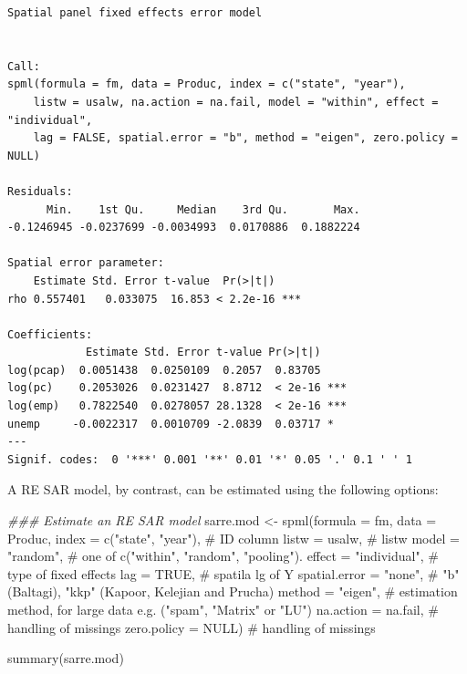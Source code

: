 \documentclass[
  letterpaper,
  DIV=11,
  numbers=noendperiod]{scrreprt}
\newenvironment{Shaded}{\begin{snugshade}}{\end{snugshade}}
\newcommand{\AttributeTok}[1]{\textcolor[rgb]{0.40,0.45,0.13}{#1}}
\newcommand{\CommentTok}[1]{\textcolor[rgb]{0.37,0.37,0.37}{#1}}
\newcommand{\ConstantTok}[1]{\textcolor[rgb]{0.56,0.35,0.01}{#1}}
\newcommand{\DocumentationTok}[1]{\textcolor[rgb]{0.37,0.37,0.37}{\textit{#1}}}
\newcommand{\FunctionTok}[1]{\textcolor[rgb]{0.28,0.35,0.67}{#1}}
\newcommand{\NormalTok}[1]{\textcolor[rgb]{0.00,0.23,0.31}{#1}}
\newcommand{\OtherTok}[1]{\textcolor[rgb]{0.00,0.23,0.31}{#1}}
\newcommand{\StringTok}[1]{\textcolor[rgb]{0.13,0.47,0.30}{#1}}
\begin{document}
\begin{verbatim}
Spatial panel fixed effects error model
 

Call:
spml(formula = fm, data = Produc, index = c("state", "year"), 
    listw = usalw, na.action = na.fail, model = "within", effect = "individual", 
    lag = FALSE, spatial.error = "b", method = "eigen", zero.policy = NULL)

Residuals:
      Min.    1st Qu.     Median    3rd Qu.       Max. 
-0.1246945 -0.0237699 -0.0034993  0.0170886  0.1882224 

Spatial error parameter:
    Estimate Std. Error t-value  Pr(>|t|)    
rho 0.557401   0.033075  16.853 < 2.2e-16 ***

Coefficients:
            Estimate Std. Error t-value Pr(>|t|)    
log(pcap)  0.0051438  0.0250109  0.2057  0.83705    
log(pc)    0.2053026  0.0231427  8.8712  < 2e-16 ***
log(emp)   0.7822540  0.0278057 28.1328  < 2e-16 ***
unemp     -0.0022317  0.0010709 -2.0839  0.03717 *  
---
Signif. codes:  0 '***' 0.001 '**' 0.01 '*' 0.05 '.' 0.1 ' ' 1
\end{verbatim}

A RE SAR model, by contrast, can be estimated using the following
options:

\begin{Shaded}
\begin{Highlighting}[]
\DocumentationTok{\#\#\# Estimate an RE SAR model}
\NormalTok{sarre.mod }\OtherTok{\textless{}{-}} \FunctionTok{spml}\NormalTok{(}\AttributeTok{formula =}\NormalTok{ fm, }\AttributeTok{data =}\NormalTok{ Produc, }
                  \AttributeTok{index =} \FunctionTok{c}\NormalTok{(}\StringTok{"state"}\NormalTok{, }\StringTok{"year"}\NormalTok{),  }\CommentTok{\# ID column}
                  \AttributeTok{listw =}\NormalTok{ usalw,          }\CommentTok{\# listw}
                  \AttributeTok{model =} \StringTok{"random"}\NormalTok{,       }\CommentTok{\# one of c("within", "random", "pooling").}
                  \AttributeTok{effect =} \StringTok{"individual"}\NormalTok{,  }\CommentTok{\# type of fixed effects}
                  \AttributeTok{lag =} \ConstantTok{TRUE}\NormalTok{,             }\CommentTok{\# spatila lg of Y}
                  \AttributeTok{spatial.error =} \StringTok{"none"}\NormalTok{, }\CommentTok{\# "b" (Baltagi), "kkp" (Kapoor, Kelejian and Prucha)}
                  \AttributeTok{method =} \StringTok{"eigen"}\NormalTok{,       }\CommentTok{\# estimation method, for large data e.g. ("spam", "Matrix" or "LU")}
                  \AttributeTok{na.action =}\NormalTok{ na.fail,    }\CommentTok{\# handling of missings}
                  \AttributeTok{zero.policy =} \ConstantTok{NULL}\NormalTok{)     }\CommentTok{\# handling of missings}

\FunctionTok{summary}\NormalTok{(sarre.mod)}
\end{Highlighting}
\end{Shaded}
\end{document}
